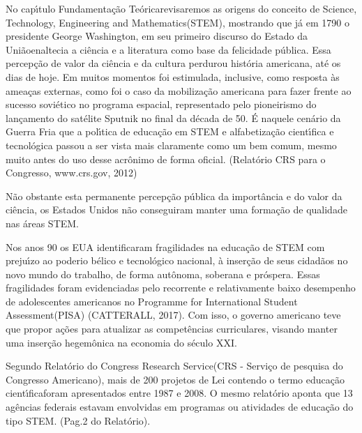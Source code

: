 \documentclass[
12pt,		%
openright,	%
twoside,  %
a4paper,			%
chapter=TITLE,		%
english,			%
french,				%
spanish,			%
brazil				%
]{USPSC-classe/USPSC}
\begin{document}
No cap\'{\i}tulo \textquotedbl Fundamenta\c{c}\~ao Te\'orica\textquotedbl  revisaremos as origens do conceito de \textquotedbl Science, Technology, Engineering and Mathematics\textquotedbl  (STEM), mostrando que j\'a em 1790 o presidente George Washington, em seu primeiro discurso do \textquotedbl Estado da Uni\~ao\textquotedbl  enaltecia a ci\^encia e a literatura como  base da \textquotedbl felicidade p\'ublica\textquotedbl  [XXX]. Essa percep\c{c}\~ao de valor da ci\^encia e da cultura perdurou hist\'oria americana, at\'e os dias de hoje. Em muitos momentos foi estimulada, inclusive, como resposta \`as amea\c{c}as externas, como foi o caso da mobiliza\c{c}\~ao americana para fazer frente ao sucesso sovi\'etico no programa espacial, representado pelo pioneirismo do lan\c{c}amento do sat\'elite Sputnik no final da d\'ecada de 50. \'E naquele cen\'ario da Guerra Fria que a pol\'{\i}tica de educa\c{c}\~ao em STEM e alfabetiza\c{c}\~ao cient\'{\i}fica e tecnol\'ogica passou a ser vista mais claramente como um bem comum, mesmo muito antes do uso desse acr\^onimo de forma oficial. (Relat\'orio CRS para o Congresso, www.crs.gov, 2012)




N\~ao obstante esta permanente percep\c{c}\~ao p\'ublica da import\^ancia e do valor da ci\^encia, os Estados Unidos n\~ao conseguiram manter uma forma\c{c}\~ao de qualidade nas \'areas STEM.




Nos anos 90 os EUA identificaram fragilidades na educa\c{c}\~ao de STEM com preju\'{\i}zo ao \textquotedbl poderio b\'elico e tecnol\'ogico nacional\textquotedbl , \`a inser\c{c}\~ao de seus cidad\~aos no novo mundo do trabalho, de forma aut\^onoma, soberana  e pr\'ospera. Essas fragilidades foram evidenciadas pelo recorrente e relativamente baixo desempenho de adolescentes americanos no \textquotedbl Programme for International Student Assessment\textquotedbl  (PISA)  (CATTERALL, 2017). Com isso, o governo americano teve que propor a\c{c}\~oes para atualizar as compet\^encias curriculares, visando manter uma inser\c{c}\~ao hegem\^onica na economia do s\'eculo XXI.




Segundo Relat\'orio do \textquotedbl Congress Research Service\textquotedbl  (CRS - Servi\c{c}o de pesquisa do Congresso Americano), mais de 200 projetos de Lei contendo o termo \textquotedbl educa\c{c}\~ao cient\'{\i}fica\textquotedbl  foram apresentados entre 1987 e 2008. O mesmo relat\'orio aponta que 13 ag\^encias federais estavam envolvidas em programas ou atividades de educa\c{c}\~ao do tipo \textquotedbl STEM\textquotedbl . (Pag.2 do Relat\'orio).
\end{document}
